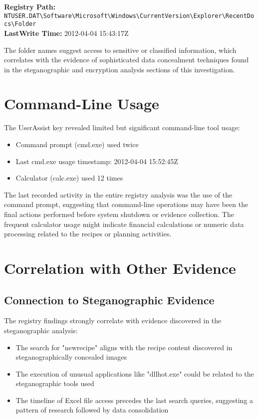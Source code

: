 \textbf{Registry Path:} \texttt{NTUSER.DAT\textbackslash Software\textbackslash Microsoft\textbackslash Windows\textbackslash CurrentVersion\textbackslash Explorer\textbackslash RecentDocs\textbackslash Folder}\\
\textbf{LastWrite Time:} 2012-04-04 15:43:17Z

The folder names suggest access to sensitive or classified information, which correlates with the evidence of sophisticated data concealment techniques found in the steganographic and encryption analysis sections of this investigation.

\section{Command-Line Usage}
The UserAssist key revealed limited but significant command-line tool usage:

\begin{itemize}
    \item Command prompt (cmd.exe) used twice
    \item Last cmd.exe usage timestamp: 2012-04-04 15:52:45Z
    \item Calculator (calc.exe) used 12 times
\end{itemize}

The last recorded activity in the entire registry analysis was the use of the command prompt, suggesting that command-line operations may have been the final actions performed before system shutdown or evidence collection. The frequent calculator usage might indicate financial calculations or numeric data processing related to the recipes or planning activities.

\section{Correlation with Other Evidence}
\subsection{Connection to Steganographic Evidence}
The registry findings strongly correlate with evidence discovered in the steganographic analysis:

\begin{itemize}
    \item The search for "newrecipe" aligns with the recipe content discovered in steganographically concealed images
    \item The execution of unusual applications like "dllhot.exe" could be related to the steganographic tools used
    \item The timeline of Excel file access precedes the last search queries, suggesting a pattern of research followed by data consolidation
\end{itemize}

